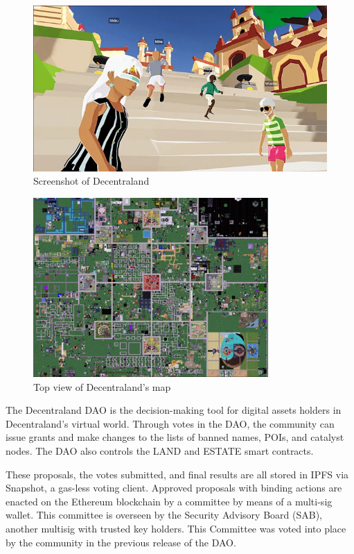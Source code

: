 \documentclass[MSE,Master,english]{twbook}%
\begin{document}
\begin{figure}[H]
  \centering
  \includegraphics[width=\textwidth]{dcl.png}
  \caption{Screenshot of Decentraland}
  \label{fig:dcl}
\end{figure}

\begin{figure}[H]
  \centering
  \includegraphics[width=0.8\textwidth]{dcl_map.png}
  \caption{Top view of Decentraland's map \cite{genesisCity}}
  \label{fig:dcl_map}
\end{figure}

The Decentraland DAO\cite{DCLDAO} is the decision-making tool for digital assets holders in Decentraland's virtual world. Through votes in the DAO, the community can issue grants and make changes to the lists of banned names, POIs, and catalyst nodes. The DAO also controls the \gls{LAND} and \gls{ESTATE} smart contracts.

These proposals, the votes submitted, and final results are all stored in IPFS via Snapshot, a gas-less voting client. Approved proposals with binding actions are enacted on the Ethereum blockchain by a committee by means of a multi-sig wallet. This committee is overseen by the Security Advisory Board (SAB), another multisig with trusted key holders. This Committee was voted into place by the community in the previous release of the DAO.
\end{document}
